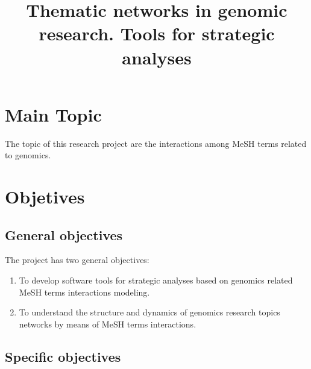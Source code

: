 \documentclass[letterpaper,12pt]{article}
\begin{document}
\title{Thematic networks in genomic research. Tools for strategic analyses} %
\maketitle

\section{Main Topic}

The topic of this research project are the interactions among MeSH terms related to genomics.

\section{Objetives}

\subsection{General objectives}
The project has two general objectives:

\begin{enumerate}
\item {To develop software tools for strategic analyses based on genomics related MeSH terms interactions modeling.} %

\item {To understand the structure and dynamics of genomics research topics networks by means of MeSH terms interactions.}%

\end{enumerate}

\subsection{Specific objectives}
\end{document}
